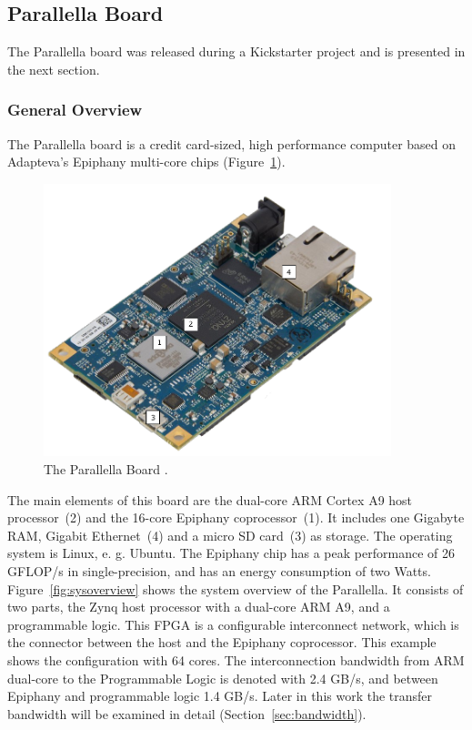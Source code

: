 \documentclass[american, hauptseminar, twoside]{zihpub}
\begin{document}
		\newpage
		\subsection{Parallella Board}
		The Parallella board was released during a Kickstarter project and is presented in the next section.
			\subsubsection{General Overview}
				The Parallella board is a credit card-sized, high performance computer based on Adapteva's Epiphany multi-core chips (Figure~\ref{fig:board}).
				\begin{figure}[H]
					\begin{center}
						\includegraphics[width=0.9\textwidth]{grafiken/board.pdf}
						\caption{The Parallella Board \cite{Parallell2014}.}
						\label{fig:board}
					\end{center}
				\end{figure}
				The main elements of this board are the dual-core ARM Cortex A9 host processor~(2) and the 16-core Epiphany coprocessor~(1). It includes one Gigabyte RAM, Gigabit Ethernet~(4) and a micro SD card~(3) as storage. The operating system is Linux, e. g. Ubuntu. The Epiphany chip has a peak performance of 26 GFLOP/s in single-precision, and has an energy consumption of two Watts.
				Figure~\ref{fig:sysoverview} shows the system overview of the Parallella. It consists of two parts, the Zynq host processor with a dual-core ARM A9, and a programmable logic. This FPGA is a configurable interconnect network, which is the connector between the host and the Epiphany coprocessor. This example shows the configuration with 64 cores. The interconnection bandwidth from ARM dual-core to the Programmable Logic is denoted with 2.4 GB/s, and between Epiphany and programmable logic 1.4 GB/s. Later in this work the transfer bandwidth will be examined in detail (Section~\ref{sec:bandwidth}).
\end{document}
